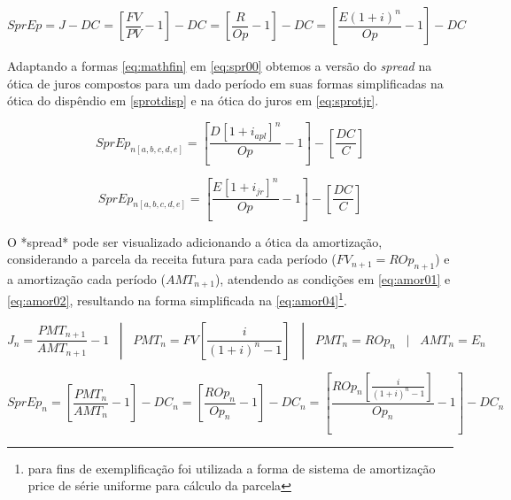 \documentclass[
  12pt,
  12pt,
  openright,
  oneside,
  a4paper,
  chapter=TITLE,
  section=TITLE,
  subsection=TITLE,
  subsubsection=TITLE,
  english,
  portugues,
  sumario=tradicional]{abntex2}
\begin{document}
\begin{apendicesenv}
\begin{equation}\label{eq:sprmf}
SprEp = J - DC_{} = [\frac{FV}{PV} - 1] - DC_{} = [\frac{R}{Op} - 1] - DC = [\frac{E(1 + i)^n}{Op} - 1] - DC_{}
\end{equation}



Adaptando a formas \autoref{eq:mathfin} em \autoref{eq:spr00} obtemos a versão do \emph{spread} na ótica de juros compostos para um dado período em suas formas simplificadas na ótica do dispêndio em \autoref{sprotdisp}  e na ótica do juros em \autoref{eq:sprotjr}. 



\begin{equation}\label{sprotdisp}
SprEp_{n[a,b,c,d,e]} = \left[  \frac{D_{}[1 + i_{apl}]^n  }{Op_{}} -1  \right] - \left[  \frac{DC_{}}{C}  \right]
\end{equation}



\begin{equation}\label{eq:sprotjr}
SprEp_{n[a,b,c,d,e]} = \left[  \frac{E_{}[1 + i_{jr}]^n }{Op_{}} -1  \right] - \left[  \frac{DC_{}}{C} \right]
\end{equation}



O *spread* pode ser visualizado adicionando a ótica da amortização, considerando a parcela da receita futura para cada período ($FV_{n+1} = ROp_{n+1}$) e a amortização cada período ($AMT_{n+1}$), atendendo as condições em \autoref{eq:amor01} e \autoref{eq:amor02}, resultando na forma simplificada na \autoref{eq:amor04}\footnote{para fins de exemplificação foi utilizada a forma de sistema de amortização price de série uniforme para cálculo da parcela}.



\begin{equation}\label{eq:amor01}
J_{n} = \frac{PMT_{n+1}}{AMT_{n+1}} - 1 \hspace{10pt} | \hspace{10pt} PMT_{n} = FV[\frac{i}{(1 + i)^n - 1}]  \hspace{10pt} | \hspace{10pt} PMT_{n} = ROp_{n} \hspace{10pt} | \hspace{10pt} AMT_{n} = E_{n}
\end{equation}




\begin{equation}\label{eq:amor02}
SprEp_{n} = [\frac{PMT_{n}}{AMT_{n}} -1] - DC_{n} = [\frac{ROp_{n}}{Op_{n}} -1] - DC_{n} = [\frac{ROp_{n}[\frac{i}{(1 + i)^n - 1}]}{Op_{n}} -1] - DC_{n}
\end{equation}





\end{apendicesenv}
\end{document}
